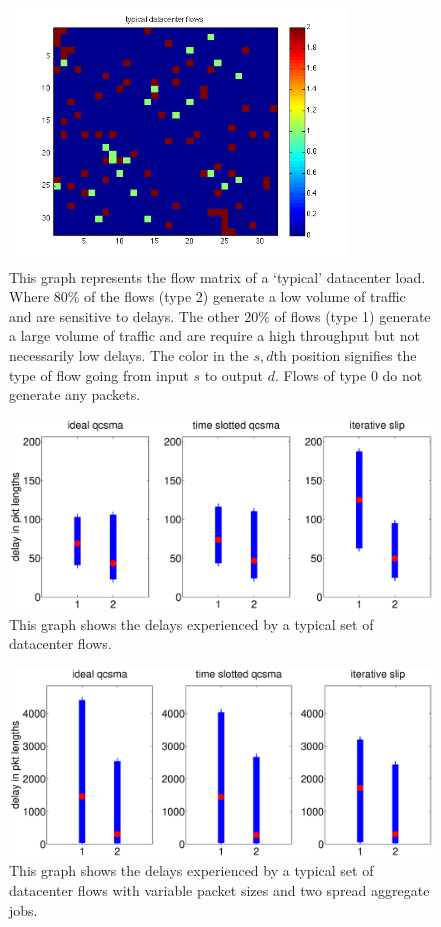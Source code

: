\documentclass[11pt]{article}%
\begin{document}
\begin{figure}
\center
	 \includegraphics[width=90mm]{typ_vs_flows.png}
	\caption{This graph represents the flow matrix of a `typical' datacenter load.  Where $80\%$ of the flows (type 2) generate a low volume of traffic and are sensitive to delays.  The other $20\%$ of flows (type 1) generate a large volume of traffic and are require a high throughput but not necessarily low delays.  The color in the $s,d$th position signifies the type of flow going from input $s$ to output $d$.  Flows of type $0$ do not generate any packets.} 	
	\label{typical_flows}
\end{figure}


\begin{figure}
\center
	 \includegraphics[width=\textwidth]{typ_vs.eps}
	\caption{This graph shows the delays experienced by a typical set of datacenter flows.}
	\label{typ_vs}
\end{figure}

\begin{figure}
\center
	 \includegraphics[width=\textwidth]{typ_spread_vs.eps}
	\caption{This graph shows the delays experienced by a typical set of datacenter flows with variable packet sizes and two spread aggregate jobs.}
	\label{typ_spread_vs}
\end{figure}
\end{document}
